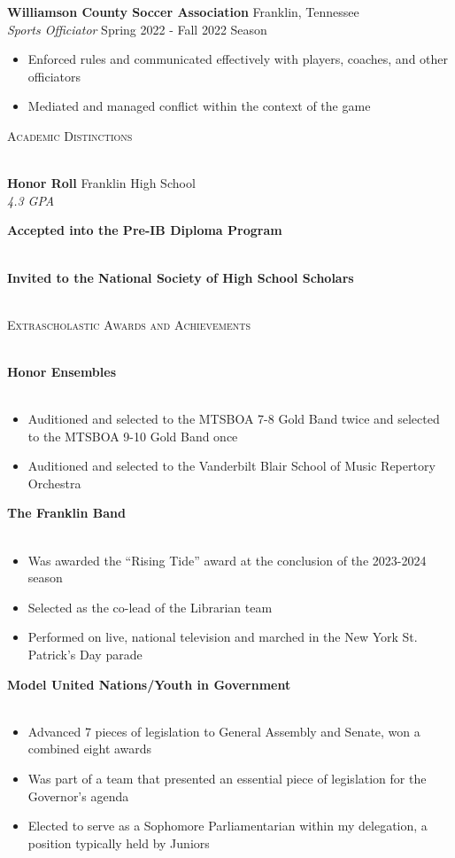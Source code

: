 \documentclass{article}
\newcommand{\lineunder} {
    \vspace*{-8pt} \\
    \hspace*{-18pt} \hrulefill \\
}
\newcommand{\header} [1] {
    {\hspace*{-18pt}\vspace*{6pt} \textsc{#1}}
    \vspace*{-6pt} \lineunder
}
\newcommand{\workexp} [4] {
	\hspace*{-18pt} \textbf{#1} \hfill #2\\
	\hspace*{-18pt} \textit{#3} \hfill #4\\
	\vspace{-1mm}
}
\begin{document}
\vspace{-2mm}

\workexp{Williamson County Soccer Association}{Franklin, Tennessee}{Sports Officiator}{Spring 2022 - Fall 2022 Season}
\begin{itemize} \itemsep 0.5pt
	\item Enforced rules and communicated effectively with players, coaches, and other officiators
	\item Mediated and managed conflict within the context of the game
\end{itemize}

\header{Academic Distinctions}
\vspace{1mm}

\workexp{Honor Roll}{Franklin High School}{4.3 GPA}{}
\vspace{2mm}
\workexp{Accepted into the Pre-IB Diploma Program}{}{}{}
\vspace{-2mm}
\workexp{Invited to the National Society of High School Scholars}{}{}{}

\header{Extrascholastic Awards and Achievements}
\vspace{1mm}

\workexp{Honor Ensembles}{}{}{}
\vspace{-6mm}
\begin{itemize} \itemsep 0.5pt
	\item Auditioned and selected to the MTSBOA 7-8 Gold Band twice and selected to the MTSBOA 9-10 Gold Band once
	\item Auditioned and selected to the Vanderbilt Blair School of Music Repertory Orchestra
\end{itemize}

\vspace{-2mm}

\workexp{The Franklin Band}{}{}{}
\vspace{-6mm}
\begin{itemize} \itemsep 0.5pt
	\item Was awarded the ``Rising Tide'' award at the conclusion of the 2023-2024 season
	\item Selected as the co-lead of the Librarian team
	\item Performed on live, national television and marched in the New York St. Patrick's Day parade
\end{itemize}

\vspace{-2mm}

\workexp{Model United Nations/Youth in Government}{}{}{}
\vspace{-6mm}
\begin{itemize} \itemsep 0.5pt
	\item Advanced 7 pieces of legislation to General Assembly and Senate, won a combined eight awards
	\item Was part of a team that presented an essential piece of legislation for the Governor's agenda
	\item Elected to serve as a Sophomore Parliamentarian within my delegation, a position typically held by Juniors
\end{itemize}
\end{document}
